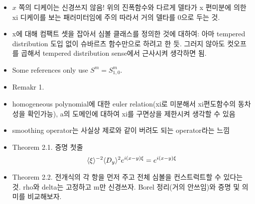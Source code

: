\documentclass{../../small}
\begin{document}
\begin{itemize}
\item $x$ 쪽의 디케이는 신경쓰지 않음! 위의 진폭함수와 다르게 델타가 x 편미분에 의한 xi 디케이를 보는 패러미터임에 주의 따라서 거의 델타를 0으로 두는 것.
\item x에 대해 컴팩트 셋을 잡아서 심볼 클래스를 정의한 것에 대하여: 아마 tempered distribution 도입 없이 슈바르츠 함수만으로 하려고 한 듯. 그러지 않아도 컷오프를 곱해서 tempered distribution sense에서 근사시켜 생각하면 됨.
\item Some references only use $S^m=S_{1,0}^m$. %
\item Remakr 1. %
\item homogeneous polynomial에 대한 euler relation(xi로 미분해서 xi편도함수의 동차성을 확인가능), a의 도메인에 대하여 xi를 구면상을 제한시켜 생각할 수 있음
\item smoothing operator는 사실상 제로와 같이 버려도 되는 operator라는 느낌
\item Theorem 2.1. 증명 첫줄
\[\langle\xi\rangle^{-2}\langle D_y\rangle^2e^{i(x-y)\xi}=e^{i(x-y)\xi}\]
\item Theorem 2.2. 전개식의 각 항을 먼저 주고 전체 심볼을 컨스트럭트할 수 있다는 것. rho와 delta는 고정하고 m만 신경쓰자. Borel 정리(거의 안쓰임)와 증명 및 의미를 비교해보자.
\end{itemize}
\end{document}
